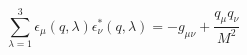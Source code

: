 \begin{equation*}
        \sum_{\lambda=1}^{3} \epsilon_\mu(q,\lambda)\epsilon^*_\nu(q,\lambda)
        = -g_{\mu\nu} + \frac{q_\mu q_\nu}{M^2}
\end{equation*}
